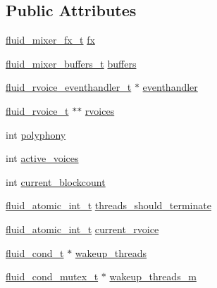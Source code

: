 \subsection*{Public Attributes}
\begin{DoxyCompactItemize}
\item 
\hyperlink{fluid__rvoice__mixer_8c_a86a88518ea54823366a9ff6942a50942}{fluid\+\_\+mixer\+\_\+fx\+\_\+t} \hyperlink{struct__fluid__rvoice__mixer__t_a8e5b10de31b5bef18fbb6e11879d7ae3}{fx}
\item 
\hyperlink{fluid__rvoice__mixer_8c_a013fb7a77265a49b5a52a8150269d306}{fluid\+\_\+mixer\+\_\+buffers\+\_\+t} \hyperlink{struct__fluid__rvoice__mixer__t_ad48ca1c244af544e8538e0cd9fc28885}{buffers}
\item 
\hyperlink{fluidsynth__priv_8h_aa59fe8f0195e9f5099f538d38b126e2a}{fluid\+\_\+rvoice\+\_\+eventhandler\+\_\+t} $\ast$ \hyperlink{struct__fluid__rvoice__mixer__t_a3a8bc6e2a86234c5018842fd5a93da6a}{eventhandler}
\item 
\hyperlink{fluid__rvoice_8h_a3c0405fcfaf1310d760cec3a503c509d}{fluid\+\_\+rvoice\+\_\+t} $\ast$$\ast$ \hyperlink{struct__fluid__rvoice__mixer__t_ae49cd043d26f61593c5d71db9c78fbd7}{rvoices}
\item 
int \hyperlink{struct__fluid__rvoice__mixer__t_a83eb532a3ea76d5a1f6d4583db8a2810}{polyphony}
\item 
int \hyperlink{struct__fluid__rvoice__mixer__t_a9f10ab971cb1806c967d5e521a32c557}{active\+\_\+voices}
\item 
int \hyperlink{struct__fluid__rvoice__mixer__t_a887c2536a382d02788100cac36edce29}{current\+\_\+blockcount}
\item 
\hyperlink{fluidsynth__priv_8h_a6b8be882dd9958ea3635a868e1bf5152}{fluid\+\_\+atomic\+\_\+int\+\_\+t} \hyperlink{struct__fluid__rvoice__mixer__t_a4bb6ff6dab89f7b93eaec2bb3e1fc0d9}{threads\+\_\+should\+\_\+terminate}
\item 
\hyperlink{fluidsynth__priv_8h_a6b8be882dd9958ea3635a868e1bf5152}{fluid\+\_\+atomic\+\_\+int\+\_\+t} \hyperlink{struct__fluid__rvoice__mixer__t_afdf8c9bc75a8455eb148930a847d704e}{current\+\_\+rvoice}
\item 
\hyperlink{fluid__sys_8h_a2125846ddcabc2675983001a57f858b4}{fluid\+\_\+cond\+\_\+t} $\ast$ \hyperlink{struct__fluid__rvoice__mixer__t_ac8faf21be91368b0be637ca95a0469db}{wakeup\+\_\+threads}
\item 
\hyperlink{fluid__sys_8h_a979272b5d11e0e22a1e7a9d6529233bb}{fluid\+\_\+cond\+\_\+mutex\+\_\+t} $\ast$ \hyperlink{struct__fluid__rvoice__mixer__t_a74281ab6f174c3ae488fb09487dda780}{wakeup\+\_\+threads\+\_\+m}
$$
\end{DoxyCompactItemize}
